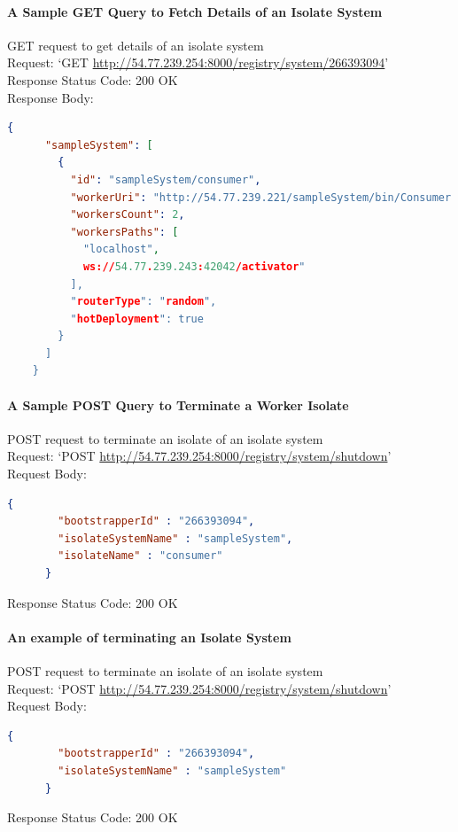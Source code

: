\paragraph{A Sample GET Query to Fetch Details of an Isolate System}
  \begin{description}
    \item{GET request to get details of an isolate system}\\
    Request: ‘GET \url{http://54.77.239.254:8000/registry/system/266393094}’\\
    Response Status Code: 200 OK\\
    Response Body:
    \begin{lstlisting}[language=json,firstnumber=1]
    {
      "sampleSystem": [
        {
          "id": "sampleSystem/consumer",
          "workerUri": "http://54.77.239.221/sampleSystem/bin/Consumer.dart",
          "workersCount": 2,
          "workersPaths": [
            "localhost",
            ws://54.77.239.243:42042/activator"
          ],
          "routerType": "random",
          "hotDeployment": true
        }
      ]
    }
  \end{lstlisting}
  \end{description}

\paragraph{A Sample POST Query to Terminate a Worker Isolate}
  \begin{description}
    \item{POST request to terminate an isolate of an isolate system}\\
    Request: ‘POST \url{http://54.77.239.254:8000/registry/system/shutdown}’\\
    Request Body:
    \begin{lstlisting}[language=json,firstnumber=1]
      {
        "bootstrapperId" : "266393094",
        "isolateSystemName" : "sampleSystem",
        "isolateName" : "consumer"
      }
    \end{lstlisting}
    Response Status Code: 200 OK
  \end{description}

\paragraph{An example of terminating an Isolate System}
  \begin{description}
    \item{POST request to terminate an isolate of an isolate system}\\
    Request: ‘POST \url{http://54.77.239.254:8000/registry/system/shutdown}’\\
    Request Body:
    \begin{lstlisting}[language=json,firstnumber=1]
      {
        "bootstrapperId" : "266393094",
        "isolateSystemName" : "sampleSystem"
      }
    \end{lstlisting}
    Response Status Code: 200 OK
  \end{description}

